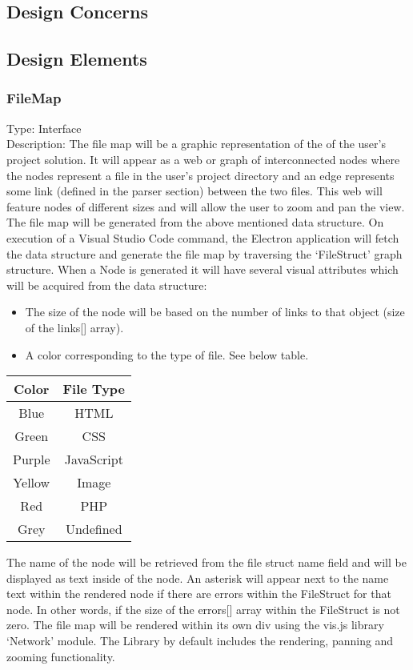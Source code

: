 \documentclass[letterpaper,10pt,titlepage,draftclsnofoot,onecolumn,onesided] {IEEEtran}
\begin{document}
	\subsection{Design Concerns}
	\subsection{Design Elements}
	\subsubsection{FileMap}
	Type: Interface
	\\
	Description: 
	The file map will be a graphic representation of the of the user's project solution. 
	It will appear as a web or graph of interconnected nodes where the nodes represent a file in the user's project directory and an edge represents some link (defined in the parser section) between the two files. 
	This web will feature nodes of different sizes and will allow the user to zoom and pan the view.
	The file map will be generated from the above mentioned data structure. 
	On execution of a Visual Studio Code command, the Electron application will fetch the data structure and generate the file map by traversing the ‘FileStruct' graph structure. 
	When a Node is generated it will have several visual attributes which will be acquired from the data structure:
	\\
	\begin{itemize}
	\item The size of the node will be based on the number of links to that object (size of the links[] array). 
	\item A color corresponding to the type of file. See below table.
	\end{itemize}
	\begin{tabular}{| c | c |}
	\hline
	Color & File Type\\
	\hline
	Blue & HTML \\
	Green & CSS \\
	Purple & JavaScript \\
	Yellow & Image \\
	Red & PHP \\
	Grey & Undefined \\
	\hline
	\end{tabular}
	
	The name of the node will be retrieved from the file struct name field and will be displayed as text inside of the node.
	An asterisk will appear next to the name text within the rendered node if there are errors within the FileStruct for that node. In other words, if the size of the errors[] array within the FileStruct is not zero.
	The file map will be rendered within its own div using the vis.js library ‘Network' module. The Library by default includes the rendering, panning and zooming functionality.
	
\end{document}
